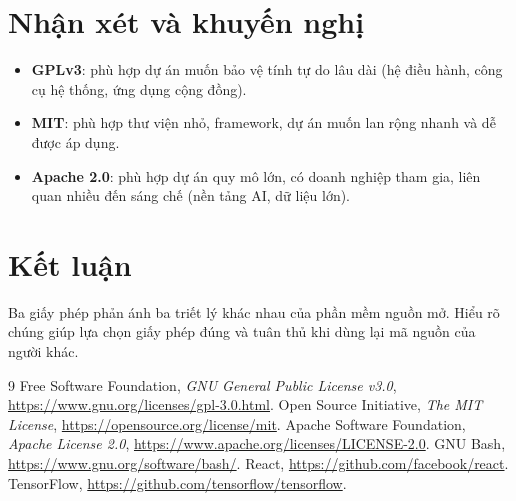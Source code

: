 \documentclass[12pt,a4paper]{article}
\begin{document}
\section{Nhận xét và khuyến nghị}
\begin{itemize}
  \item \textbf{GPLv3}: phù hợp dự án muốn bảo vệ tính tự do lâu dài (hệ điều hành, công cụ hệ thống, ứng dụng cộng đồng).
  \item \textbf{MIT}: phù hợp thư viện nhỏ, framework, dự án muốn lan rộng nhanh và dễ được áp dụng.
  \item \textbf{Apache 2.0}: phù hợp dự án quy mô lớn, có doanh nghiệp tham gia, liên quan nhiều đến sáng chế (nền tảng AI, dữ liệu lớn).
\end{itemize}

\section{Kết luận}
Ba giấy phép phản ánh ba triết lý khác nhau của phần mềm nguồn mở. Hiểu rõ chúng giúp lựa chọn giấy phép đúng và tuân thủ khi dùng lại mã nguồn của người khác.

\begin{thebibliography}{9}
 Free Software Foundation, \textit{GNU General Public License v3.0}, \url{https://www.gnu.org/licenses/gpl-3.0.html}.
 Open Source Initiative, \textit{The MIT License}, \url{https://opensource.org/license/mit}.
 Apache Software Foundation, \textit{Apache License 2.0}, \url{https://www.apache.org/licenses/LICENSE-2.0}.
 GNU Bash, \url{https://www.gnu.org/software/bash/}.
 React, \url{https://github.com/facebook/react}.
 TensorFlow, \url{https://github.com/tensorflow/tensorflow}.
\end{thebibliography}
\end{document}
